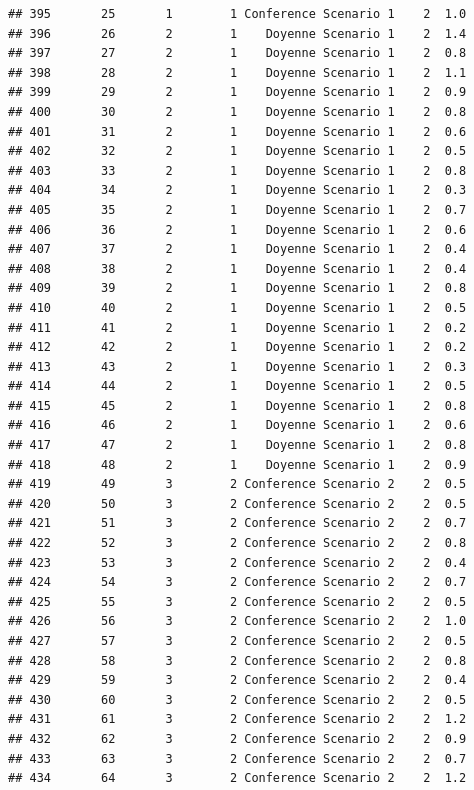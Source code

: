 \documentclass[
]{article}
\begin{document}
\begin{verbatim}
## 395       25       1        1 Conference Scenario 1    2  1.0
## 396       26       2        1    Doyenne Scenario 1    2  1.4
## 397       27       2        1    Doyenne Scenario 1    2  0.8
## 398       28       2        1    Doyenne Scenario 1    2  1.1
## 399       29       2        1    Doyenne Scenario 1    2  0.9
## 400       30       2        1    Doyenne Scenario 1    2  0.8
## 401       31       2        1    Doyenne Scenario 1    2  0.6
## 402       32       2        1    Doyenne Scenario 1    2  0.5
## 403       33       2        1    Doyenne Scenario 1    2  0.8
## 404       34       2        1    Doyenne Scenario 1    2  0.3
## 405       35       2        1    Doyenne Scenario 1    2  0.7
## 406       36       2        1    Doyenne Scenario 1    2  0.6
## 407       37       2        1    Doyenne Scenario 1    2  0.4
## 408       38       2        1    Doyenne Scenario 1    2  0.4
## 409       39       2        1    Doyenne Scenario 1    2  0.8
## 410       40       2        1    Doyenne Scenario 1    2  0.5
## 411       41       2        1    Doyenne Scenario 1    2  0.2
## 412       42       2        1    Doyenne Scenario 1    2  0.2
## 413       43       2        1    Doyenne Scenario 1    2  0.3
## 414       44       2        1    Doyenne Scenario 1    2  0.5
## 415       45       2        1    Doyenne Scenario 1    2  0.8
## 416       46       2        1    Doyenne Scenario 1    2  0.6
## 417       47       2        1    Doyenne Scenario 1    2  0.8
## 418       48       2        1    Doyenne Scenario 1    2  0.9
## 419       49       3        2 Conference Scenario 2    2  0.5
## 420       50       3        2 Conference Scenario 2    2  0.5
## 421       51       3        2 Conference Scenario 2    2  0.7
## 422       52       3        2 Conference Scenario 2    2  0.8
## 423       53       3        2 Conference Scenario 2    2  0.4
## 424       54       3        2 Conference Scenario 2    2  0.7
## 425       55       3        2 Conference Scenario 2    2  0.5
## 426       56       3        2 Conference Scenario 2    2  1.0
## 427       57       3        2 Conference Scenario 2    2  0.5
## 428       58       3        2 Conference Scenario 2    2  0.8
## 429       59       3        2 Conference Scenario 2    2  0.4
## 430       60       3        2 Conference Scenario 2    2  0.5
## 431       61       3        2 Conference Scenario 2    2  1.2
## 432       62       3        2 Conference Scenario 2    2  0.9
## 433       63       3        2 Conference Scenario 2    2  0.7
## 434       64       3        2 Conference Scenario 2    2  1.2

\end{verbatim}
\end{document}
